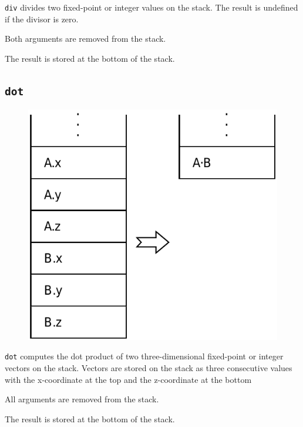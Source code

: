 			\texttt{div} divides two fixed-point or integer values on the
			stack.  The result is undefined if the divisor is zero.
			
			Both arguments are removed from the stack.
			
			The result is stored at the bottom of the stack.
	
	\qquad
	
	\subsection*{\texttt{dot}}
	
		\begin{figure}
			\begin{flushright}
				\includegraphics[width=\linewidth]{figure/pdf/i_dot} 
			\end{flushright}
		\end{figure}
	
			\texttt{dot} computes the dot product of two three-dimensional
			fixed-point or integer vectors on the stack. Vectors are stored on
			the stack as three consecutive values with the x-coordinate at the
			top and the z-coordinate at the bottom
			
			All arguments are removed from the stack.
			
			The result is stored at the bottom of the stack. \\\\\\
	
